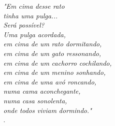 \begin{epigrafe}
	\vspace*{\fill}
	\begin{flushright}
        \textit{"Em cima desse rato\\
        tinha uma pulga...\\
        Será possível?\\
        Uma pulga acordada,\\
        em cima de um rato dormitando,\\
        em cima de um gato ressonando,\\
        em cima de um cachorro cochilando,\\
        em cima de um menino sonhando,\\
        em cima de uma avó roncando,\\
        numa cama aconchegante,\\
        numa casa sonolenta,\\
        onde todos viviam dormindo."\\}
        \cite{casasonolenta}.
	\end{flushright}
\end{epigrafe}